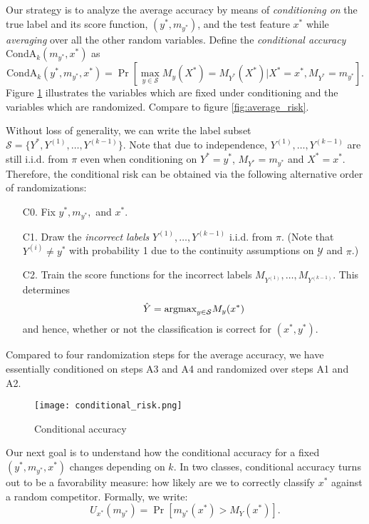 \documentclass[12pt]{article}
\begin{document}
Our strategy is to analyze the average accuracy by
means of \emph{conditioning on} the true label and its score function, $(y^*, m_{y^*})$, and the test feature $x^*$
while \emph{averaging} over all the other random variables.  Define
the \emph{conditional accuracy} $\text{CondA}_k(m_{y^*}, x^*)$ as
\[
\text{CondA}_k(y^*, m_{y^*}, x^*) = \Pr[\max_{y \in \mathcal{S}} M_y(X^*) = M_{Y^*}(X^*) | X^* = x^*, M_{Y^*} = m_{y^*}].
\]
Figure \ref{fig:conditional_risk} illustrates the variables which are
fixed under conditioning and the variables which are randomized.
Compare to figure \ref{fig:average_risk}.

Without loss of generality, we can write the label subset $\mathcal{S}
= \{Y^*, Y^{(1)},\hdots, Y^{(k-1)}\}$.  Note that due to independence,
$Y^{(1)},\hdots, Y^{(k-1)}$ are still i.i.d. from $\pi$ even
when conditioning on $Y^*= y^*$, $M_{Y^*} = m_{y^*}$ and $X^*=x^*$. 
Therefore, the conditional risk can be
obtained via the following alternative order of randomizations:
\begin{enumerate}
\item[C0.] 
Fix $y^*, m_{y^*},$ and $x^*$.
\item[C1.]
Draw the \emph{incorrect labels} $Y^{(1)},\hdots, Y^{(k-1)}$ i.i.d. from
$\pi$.  (Note that $Y^{(i)} \neq y^*$ with probability 1 due to the
continuity assumptions on $\mathcal{Y}$ and $\pi$.)
\item[C2.]
Train the score functions for the incorrect labels
$M_{Y^{(1)}},\hdots, M_{Y^{(k-1)}}$.  This determines
\[
\hat{Y} = \text{argmax}_{y \in \mathcal{S}} M_y(x^*)
\]
and hence, whether or not the classification is correct for $(x^*, y^*)$.
\end{enumerate}
Compared to four randomization steps for the average accuracy, we have
essentially conditioned on steps A3 and A4 and randomized over steps
A1 and A2. 

\begin{figure}[h]
\centering
\texttt{[image: conditional\_risk.png]}
\caption{Conditional accuracy}\label{fig:conditional_risk}
\end{figure}

Our next goal is to understand how the conditional accuracy for a fixed $(y^*, m_{y^*}, x^*)$ changes depending on $k$. In two classes, conditional accuracy turns out to be a favorability measure: how likely are we to correctly classify $x^*$ against a random competitor. Formally, we write:
\begin{equation}\label{eq:U_function}
U_{x^*}(m_{y^*}) = \Pr[m_{y^*}(x^*) > M_Y(x^*)].
\end{equation}
\end{document}
